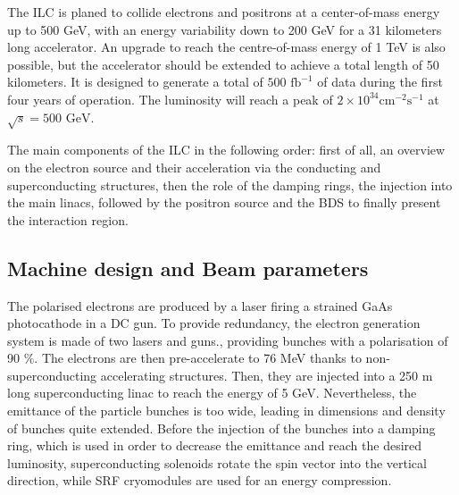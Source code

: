     The ILC is planed to collide electrons and positrons at a center-of-mass energy up to 500 GeV, with an energy variability down to 200 GeV for a 31 kilometers long accelerator. 
    An upgrade to reach the centre-of-mass energy of 1 TeV is also possible, but the accelerator should be extended to achieve a total length of 50 kilometers.
    It is designed to generate a total of $500\text{ fb}^{-1}$ of data during the first four years of operation. The luminosity will reach a peak of $2 \times 10^{34}\text{cm}^{-2}\text{s}^{-1}$ at $\sqrt s = 500\text{ GeV}$.


    The main components of the ILC in the following order: first of all, an overview on the electron source and their acceleration via the conducting and superconducting structures, then the role of the damping rings, the injection into the main linacs, followed by the positron source and the \gls{BDS} to finally present the interaction region.

    \subsection{Machine design and Beam parameters}
    \label{subsec:design}

    The polarised electrons are produced by a laser firing a strained GaAs photocathode in a \gls{DC} gun.
    To provide redundancy, the electron generation system is made of two lasers and guns., providing bunches with a polarisation of 90 $\%$.
    The electrons are then pre-accelerate to 76 MeV thanks to non-superconducting accelerating structures.
    Then, they are injected into a 250 m long superconducting linac to reach the energy of 5 GeV.
    Nevertheless, the emittance of the particle bunches is too wide, leading in dimensions and density of bunches quite extended.
    Before the injection of the bunches into a damping ring, which is used in order to decrease the emittance and reach the desired luminosity, superconducting solenoids rotate the spin vector into the vertical direction, while \gls{SRF} cryomodules are used for an energy compression.
 
